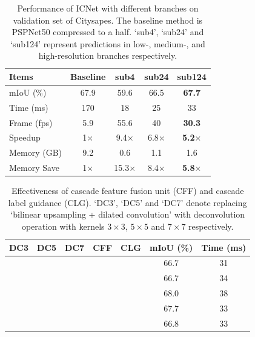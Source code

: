 \documentclass[runningheads]{llncs}
\begin{document}
\begin{table}[bpt]
	\setlength{\tabcolsep}{6pt}
	\caption{Performance of ICNet with different branches on validation set of Citysapes. The baseline method is PSPNet50 compressed to a half. `sub4', `sub24' and `sub124' represent predictions in low-, medium-, and high-resolution branches respectively.}
	\label{tab:imagecascadeperformance}
	\begin{center}
		\begin{tabular}{l | c c c c}
			\toprule[1pt]
			Items & Baseline & sub4 & sub24 & sub124 \\
			\hline
			\hline
			mIoU (\%) & 67.9 & 59.6 & 66.5 & \textbf{67.7} \\
			Time (ms) & 170 & 18 & 25 & 33 \\
			Frame (fps) & 5.9 & 55.6 & 40 & \textbf{30.3} \\
			Speedup & 1$\times$ & 9.4$\times$ & 6.8$\times$ & \textbf{5.2}$\times$ \\
			Memory (GB) & 9.2 & 0.6 & 1.1 & 1.6 \\
			Memory Save & 1$\times$ & 15.3$\times$ & 8.4$\times$ & \textbf{5.8}$\times$\\
			\bottomrule[1pt]
		\end{tabular}
	\end{center}
\end{table}

\begin{table}[bpt]
	\setlength{\tabcolsep}{4pt}
	\caption{Effectiveness of cascade feature fusion unit (CFF) and cascade label guidance (CLG). `DC3', `DC5' and `DC7' denote replacing `bilinear upsampling + dilated convolution' with deconvolution operation with kernels $3 \times 3$, $5 \times 5$ and $7 \times 7$ respectively.}
	\label{tab:cff_clg}
	\begin{center}
		\begin{tabular}{c c c c c | c c}
			\toprule[1pt]
			DC3 & DC5 & DC7 & CFF & CLG & mIoU (\%) & Time (ms) \\
			\hline
			\hline
			\checkmark & & & & \checkmark & 66.7 & 31 \\
			& \checkmark & & & \checkmark & 66.7 & 34 \\
			& & \checkmark & & \checkmark & 68.0 & 38 \\
			\rowcolor{Gray}
			& & & \checkmark & \checkmark & 67.7 & 33 \\
			& & & \checkmark & & 66.8 & 33 \\
			\bottomrule[1pt]
		\end{tabular}
	\end{center}
\end{table}
\end{document}
